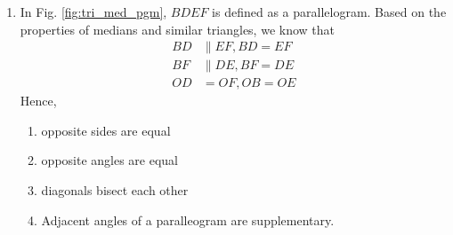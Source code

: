 \renewcommand{\theequation}{\theenumi}
\begin{enumerate}[label=\arabic*.,ref=\thesubsection.\theenumi]
\item In Fig. 	\ref{fig:tri_med_pgm}, 	$BDEF$ is defined as a parallelogram. Based on the properties of medians and similar triangles, we know that
\label{them:pgm_basic}
%
\begin{align}
BD &\parallel EF, BD = EF
\\
BF &\parallel DE, BF = DE
\\
OD &= OF, OB = OE
\end{align} 
Hence, 
\begin{enumerate}
\item opposite sides are equal 
\item  opposite angles are equal
\item  diagonals bisect each other
\item Adjacent angles of a paralleogram are supplementary.
\end{enumerate}


\end{enumerate}

